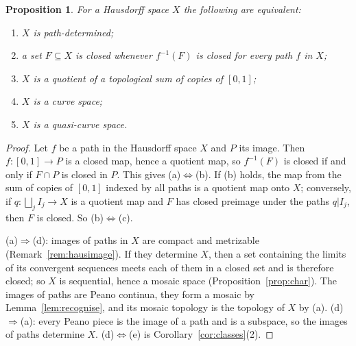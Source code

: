 \documentclass[11pt]{amsart}
\newtheorem{proposition}[theorem]{Proposition}
\theoremstyle{definition}
\theoremstyle{remark}
\numberwithin{equation}{section}
\begin{document}
\begin{proposition}\label{prop:pathdet}
For a Hausdorff space $X$ the following are equivalent:
\begin{enumerate}[label=\textup{(\alph*)}]
\item $X$ is path-determined;
\item a set $F\subseteq X$ is closed whenever $f^{-1}(F)$ is closed for every path $f$ in $X$;
\item $X$ is a quotient of a topological sum of copies of $[0,1]$;
\item $X$ is a curve space;
\item $X$ is a quasi-curve space.
\end{enumerate}
\end{proposition}
\begin{proof}
Let $f$ be a path in the Hausdorff space $X$ and $P$ its image. Then $f\colon[0,1]\to P$ is a closed map, hence a quotient map, so $f^{-1}(F)$ is closed if and only if $F\cap P$ is closed in $P$. This gives (a)$\Leftrightarrow$(b). If (b) holds, the map from the sum of copies of $[0,1]$ indexed by all paths is a quotient map onto $X$; conversely, if $q\colon\bigsqcup_jI_j\to X$ is a quotient map and $F$ has closed preimage under the paths $q|I_j$, then $F$ is closed. So (b)$\Leftrightarrow$(c).

(a)$\Rightarrow$(d): images of paths in $X$ are compact and metrizable (Remark~\ref{rem:hausimage}). If they determine $X$, then a set containing the limits of its convergent sequences meets each of them in a closed set and is therefore closed; so $X$ is sequential, hence a mosaic space (Proposition~\ref{prop:char}). The images of paths are Peano continua, they form a mosaic by Lemma~\ref{lem:recognise}, and its mosaic topology is the topology of $X$ by (a). (d)$\Rightarrow$(a): every Peano piece is the image of a path and is a subspace, so the images of paths determine $X$. (d)$\Leftrightarrow$(e) is Corollary~\ref{cor:classes}(2).
\end{proof}
\end{document}
